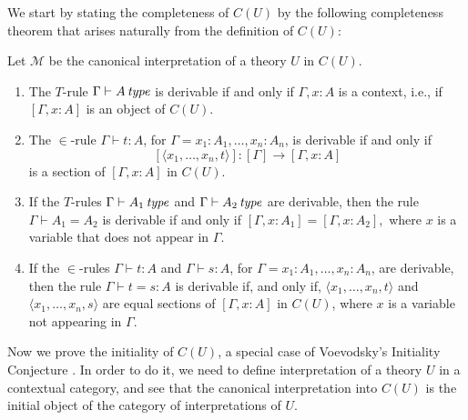 We start by stating the completeness of $C(U)$ by the following completeness theorem that 
arises naturally from the definition of $C(U)$:
\begin{theorem} \label{thm:completeness-context-category}
    Let $\mathcal{M}$ be the canonical interpretation of a theory $U$ in $C(U)$.
    \begin{enumerate}
        \item The $T$-rule $\Gamma \vdash A \operatorname{\mathit{\space type}}$
            is derivable if and only if
            $\Gamma, x \colon A$
            is a context, i.e., if $[\Gamma, x \colon A]$
            is an object of $C(U)$.
        \item The $\in$-rule $\Gamma \vdash t \colon A$, for $\Gamma = x_1 \colon A_1, \dots, x_n \colon A_n$, is derivable if and only if
            $$[\langle x_1, \dots, x_n, t \rangle] \colon [\Gamma] \to [\Gamma, x \colon A]$$ is a section of 
            $[\Gamma, x \colon A]$
            in $C(U)$.
        \item If the $T$-rules $\Gamma \vdash A_1 \operatorname{\mathit{\space type}}$ and $\Gamma \vdash A_2 \operatorname{\mathit{\space type}}$ are derivable, 
            then the rule \(
                \Gamma \vdash A_1 = A_2
            \) is derivable if and only if \(
                [\Gamma, x \colon A_1]
                = 
                [\Gamma, x \colon A_2],
            \)
            where $x$ is a variable that does not appear in $\Gamma$.
        \item If the $\in$-rules $\Gamma \vdash t \colon A$ and $\Gamma \vdash s \colon A$, for $\Gamma = x_1 \colon A_1, \dots, x_n \colon A_n$, are derivable, 
            then the rule $\Gamma \vdash t = s \colon A$ is derivable
            if, and only if, $\langle x_1, \dots, x_n, t \rangle$ and 
            $\langle x_1, \dots, x_n, s \rangle$
            are equal sections of $[\Gamma, x\colon A]$ in $C(U)$,
            where $x$ is a variable not appearing in $\Gamma$.
    \end{enumerate}
\end{theorem}

Now we prove the initiality of $C(U)$, a special case of Voevodsky's Initiality Conjecture \cite{voevodsky2017}. 
In order to do it, we need to define interpretation of a theory $U$
in a contextual category, and see that the canonical interpretation into $C(U)$ is the 
initial object of the category of interpretations of $U$.

